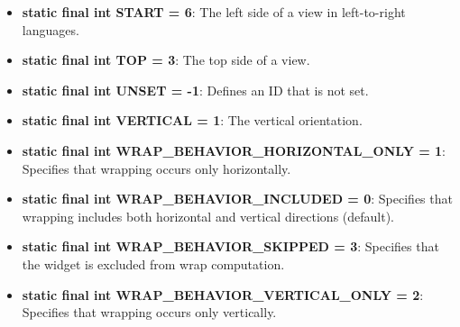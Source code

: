 \documentclass{report}
\begin{document}
\begin{itemize}
\begin{itemize}
                \item \textbf{static final int START = 6}: The left side of a view in left-to-right languages.
                \item \textbf{static final int TOP = 3}: The top side of a view.
                \item \textbf{static final int UNSET = -1}: Defines an ID that is not set.
                \item \textbf{static final int VERTICAL = 1}: The vertical orientation.
                \item \textbf{static final int WRAP\_BEHAVIOR\_HORIZONTAL\_ONLY = 1}: Specifies that wrapping occurs only horizontally.
                \item \textbf{static final int WRAP\_BEHAVIOR\_INCLUDED = 0}: Specifies that wrapping includes both horizontal and vertical directions (default).
                \item \textbf{static final int WRAP\_BEHAVIOR\_SKIPPED = 3}: Specifies that the widget is excluded from wrap computation.
                \item \textbf{static final int WRAP\_BEHAVIOR\_VERTICAL\_ONLY = 2}: Specifies that wrapping occurs only vertically.
            \end{itemize}


    \end{itemize}



    \pagebreak 
\end{document}
